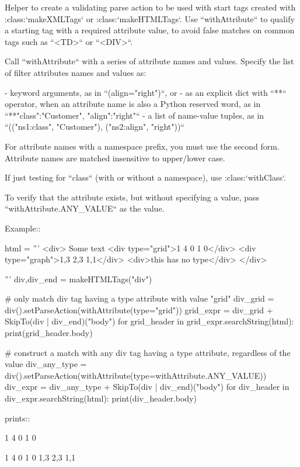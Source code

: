 \begin{DoxyVerb}Helper to create a validating parse action to be used with start
tags created with :class:`makeXMLTags` or
:class:`makeHTMLTags`. Use ``withAttribute`` to qualify
a starting tag with a required attribute value, to avoid false
matches on common tags such as ``<TD>`` or ``<DIV>``.

Call ``withAttribute`` with a series of attribute names and
values. Specify the list of filter attributes names and values as:

 - keyword arguments, as in ``(align="right")``, or
 - as an explicit dict with ``**`` operator, when an attribute
   name is also a Python reserved word, as in ``**{"class":"Customer", "align":"right"}``
 - a list of name-value tuples, as in ``(("ns1:class", "Customer"), ("ns2:align", "right"))``

For attribute names with a namespace prefix, you must use the second
form.  Attribute names are matched insensitive to upper/lower case.

If just testing for ``class`` (with or without a namespace), use
:class:`withClass`.

To verify that the attribute exists, but without specifying a value,
pass ``withAttribute.ANY_VALUE`` as the value.

Example::

    html = '''
        <div>
        Some text
        <div type="grid">1 4 0 1 0</div>
        <div type="graph">1,3 2,3 1,1</div>
        <div>this has no type</div>
        </div>

    '''
    div,div_end = makeHTMLTags("div")

    # only match div tag having a type attribute with value "grid"
    div_grid = div().setParseAction(withAttribute(type="grid"))
    grid_expr = div_grid + SkipTo(div | div_end)("body")
    for grid_header in grid_expr.searchString(html):
        print(grid_header.body)

    # construct a match with any div tag having a type attribute, regardless of the value
    div_any_type = div().setParseAction(withAttribute(type=withAttribute.ANY_VALUE))
    div_expr = div_any_type + SkipTo(div | div_end)("body")
    for div_header in div_expr.searchString(html):
        print(div_header.body)

prints::

    1 4 0 1 0

    1 4 0 1 0
    1,3 2,3 1,1
\end{DoxyVerb}
 \mbox{\label{namespacepyparsing_a7e7ce66cc9889c783c6d086ffd29eec9}} 
